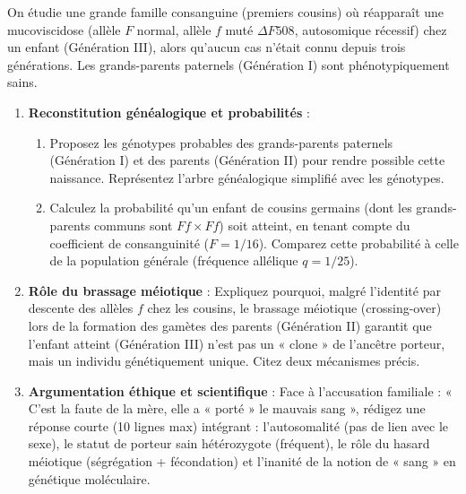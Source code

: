 \documentclass[11pt]{article}
\begin{document}
\begin{exercice}
On étudie une grande famille consanguine (premiers cousins) où réapparaît une mucoviscidose (allèle $F$ normal, allèle $f$ muté $\Delta F508$, autosomique récessif) chez un enfant (Génération III), alors qu'aucun cas n'était connu depuis trois générations. Les grands-parents paternels (Génération I) sont phénotypiquement sains.

\begin{enumerate}
    \item \textbf{Reconstitution généalogique et probabilités} : 
    \begin{enumerate}
        \item Proposez les génotypes probables des grands-parents paternels (Génération I) et des parents (Génération II) pour rendre possible cette naissance. Représentez l'arbre généalogique simplifié avec les génotypes.
        \item Calculez la probabilité qu'un enfant de cousins germains (dont les grands-parents communs sont $Ff \times Ff$) soit atteint, en tenant compte du coefficient de consanguinité ($F = 1/16$). Comparez cette probabilité à celle de la population générale (fréquence allélique $q = 1/25$).
    \end{enumerate}
    \item \textbf{Rôle du brassage méiotique} : Expliquez pourquoi, malgré l'identité par descente des allèles $f$ chez les cousins, le brassage méiotique (crossing-over) lors de la formation des gamètes des parents (Génération II) garantit que l'enfant atteint (Génération III) n'est pas un « clone » de l'ancêtre porteur, mais un individu génétiquement unique. Citez deux mécanismes précis.
    \item \textbf{Argumentation éthique et scientifique} : Face à l'accusation familiale : « C'est la faute de la mère, elle a « porté » le mauvais sang », rédigez une réponse courte (10 lignes max) intégrant : l'autosomalité (pas de lien avec le sexe), le statut de porteur sain hétérozygote (fréquent), le rôle du hasard méiotique (ségrégation + fécondation) et l'inanité de la notion de « sang » en génétique moléculaire.
\end{enumerate}
\end{exercice}
\end{document}
